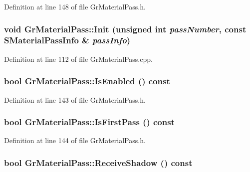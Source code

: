 Definition at line 148 of file GrMaterialPass.h.\hypertarget{class_gr_material_pass_9ca0165a2f76e561040f97a821652a98}{
\subsubsection[{Init}]{\setlength{\rightskip}{0pt plus 5cm}void GrMaterialPass::Init (unsigned int {\em passNumber}, \/  const {\bf SMaterialPassInfo} \& {\em passInfo})}}
\label{class_gr_material_pass_9ca0165a2f76e561040f97a821652a98}




Definition at line 112 of file GrMaterialPass.cpp.\hypertarget{class_gr_material_pass_ad6cbb60949c8176c9e7248f3208ee75}{
\subsubsection[{IsEnabled}]{\setlength{\rightskip}{0pt plus 5cm}bool GrMaterialPass::IsEnabled () const}}
\label{class_gr_material_pass_ad6cbb60949c8176c9e7248f3208ee75}




Definition at line 143 of file GrMaterialPass.h.\hypertarget{class_gr_material_pass_e8a92f3084a45fcd9337e2488719400d}{
\subsubsection[{IsFirstPass}]{\setlength{\rightskip}{0pt plus 5cm}bool GrMaterialPass::IsFirstPass () const}}
\label{class_gr_material_pass_e8a92f3084a45fcd9337e2488719400d}




Definition at line 144 of file GrMaterialPass.h.\hypertarget{class_gr_material_pass_ca6fb93ef3404e9aad9396cd7aecb083}{
\subsubsection[{ReceiveShadow}]{\setlength{\rightskip}{0pt plus 5cm}bool GrMaterialPass::ReceiveShadow () const}}
\label{class_gr_material_pass_ca6fb93ef3404e9aad9396cd7aecb083}




